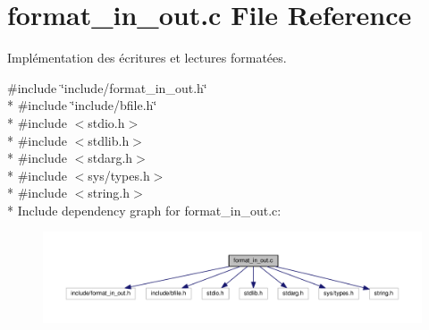 \section{format\+\_\+in\+\_\+out.\+c File Reference}
\label{format__in__out_8c}


Implémentation des écritures et lectures formatées.  


{\ttfamily \#include \char`\"{}include/format\+\_\+in\+\_\+out.\+h\char`\"{}}\\*
{\ttfamily \#include \char`\"{}include/bfile.\+h\char`\"{}}\\*
{\ttfamily \#include $<$stdio.\+h$>$}\\*
{\ttfamily \#include $<$stdlib.\+h$>$}\\*
{\ttfamily \#include $<$stdarg.\+h$>$}\\*
{\ttfamily \#include $<$sys/types.\+h$>$}\\*
{\ttfamily \#include $<$string.\+h$>$}\\*
Include dependency graph for format\+\_\+in\+\_\+out.\+c\+:\nopagebreak
\begin{figure}[H]
\begin{center}
\leavevmode
\includegraphics[width=350pt]{format__in__out_8c__incl}
\end{center}
\end{figure}
